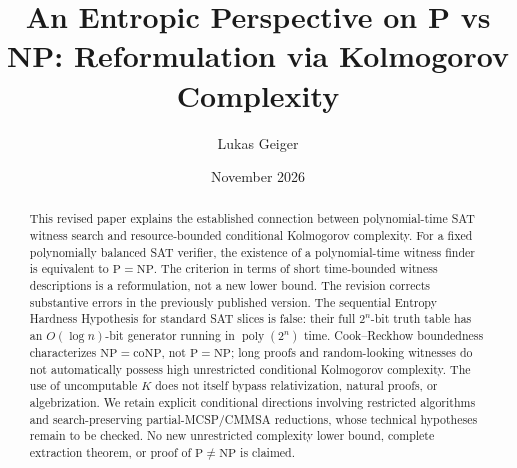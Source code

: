 \documentclass[aps,prd,twocolumn,superscriptaddress,nofootinbib]{revtex4-2}
\theoremstyle{definition}
\theoremstyle{remark}
\DeclareMathOperator{\poly}{poly}
\newcommand{\NP}{\mathrm{NP}}
\newcommand{\PP}{\mathrm{P}}
\newcommand{\coNP}{\mathrm{coNP}}
\begin{document}

\title{An Entropic Perspective on P vs NP: Reformulation via Kolmogorov Complexity}

\author{Lukas Geiger}

\date{November 2026}

\begin{abstract}
This revised paper explains the established connection between
polynomial-time SAT witness search and resource-bounded conditional
Kolmogorov complexity. For a fixed polynomially balanced SAT verifier,
the existence of a polynomial-time witness finder is equivalent to
$\PP=\NP$. The criterion in terms of short time-bounded witness
descriptions is a reformulation, not a new lower bound.
The revision corrects substantive errors in the previously
published version. The sequential Entropy Hardness Hypothesis for
standard SAT slices is false: their full $2^n$-bit truth table has
an $O(\log n)$-bit generator running in $\poly(2^n)$ time.
Cook--Reckhow boundedness characterizes $\NP=\coNP$, not $\PP=\NP$;
long proofs and random-looking witnesses do not automatically
possess high unrestricted conditional Kolmogorov complexity.
The use of uncomputable $K$ does not itself bypass relativization,
natural proofs, or algebrization. We retain explicit conditional
directions involving restricted algorithms and search-preserving
partial-MCSP/CMMSA reductions, whose technical hypotheses remain
to be checked. No new unrestricted complexity lower bound,
complete extraction theorem, or proof of $\PP\ne\NP$ is claimed.
\end{abstract}




\maketitle
\clearpage
\tableofcontents
\clearpage
\end{document}
